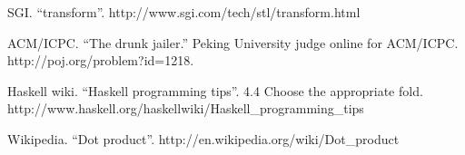 \documentclass{article}
\begin{document}
\begin{thebibliography}{99}
SGI. ``transform''. http://www.sgi.com/tech/stl/transform.html

ACM/ICPC. ``The drunk jailer.'' Peking University judge online for ACM/ICPC. http://poj.org/problem?id=1218.

Haskell wiki. ``Haskell programming tips''. 4.4 Choose the appropriate fold. http://www.haskell.org/haskellwiki/Haskell\_programming\_tips

Wikipedia. ``Dot product''. http://en.wikipedia.org/wiki/Dot\_product

\end{thebibliography}

\ifx\wholebook\relax \else
\end{document}
